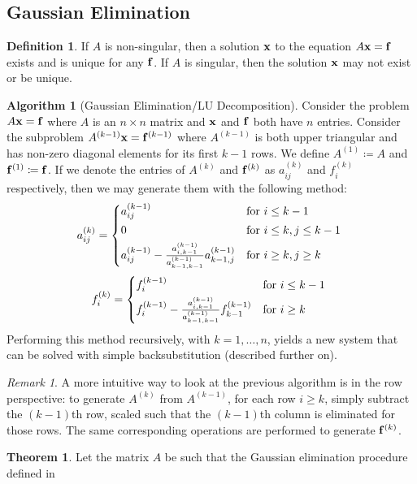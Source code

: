 \documentclass[11pt,letterpaper]{article}
\numberwithin{figure}{section} %
\newcommand{\keyword}[1]{\colorbox{cyan!20!}{#1}}
\theoremstyle{definition}
\newtheorem{theorem}{Theorem}[subsection]
\theoremstyle{definition}
\theoremstyle{definition}
\theoremstyle{definition}
\newtheorem{definition}{Definition}[subsection]
\theoremstyle{definition}
\theoremstyle{remark}
\newtheorem*{remark}{Remark}
\theoremstyle{remark}
\theoremstyle{definition}
\newtheorem*{algorithm}{Algorithm}
\theoremstyle{remark}
\theoremstyle{remark}
\begin{document}
\begin{multicols*}{3}
\subsection{Gaussian Elimination}
\begin{definition}
	If $A$ is \keyword{non-singular}, then a solution $\vb{x}$ to the equation
	$A\vb{x} = \vb{f}$ exists and is unique for any $\vb{f}$. If $A$ is
	\keyword{singular}, then the solution $\vb{x}$ may not exist or be unique.
\end{definition}
\begin{algorithm}[Gaussian Elimination/LU Decomposition]\label{alg:GE}
	Consider the problem $A\vb{x} = \vb{f}$ where $A$ is an $n \times n$ matrix
	and $\vb{x}$ and $\vb{f}$ both have $n$ entries. Consider the subproblem
	$A^{(k-1)}\vb{x} = \vb{f}^{(k-1)}$ where $A^{(k-1)}$ is both upper triangular and has
	non-zero diagonal elements for its first $k-1$ rows. We define $A^{(1)} \coloneqq
	A$ and $\vb{f}^{(1)} \coloneqq \vb{f}$. If we denote the entries of
	$A^{(k)}$ and $\vb{f}^{(k)}$ as $a_{ij}^{(k)}$ and $f_i^{(k)}$ respectively,
	then we may generate them with the following method:
	\[
		a_{ij}^{(k)} = 
		\begin{cases*}
			a_{ij}^{(k-1)} & for $i \leq k - 1$ \\
			0 & for $i \leq k, j \leq k -1$ \\
			a_{ij}^{(k-1)} - \frac{a_{i, k-1}^{(k-1)}}{a_{k-1, k-1}^{(k-1)}} a_{k-1,j}^{(k-1)} & for $i \geq k, j \geq k$
		\end{cases*}
	\]
	\[
		f_i^{(k)} = 
		\begin{cases*}
			f_i^{(k-1)} & for $i \leq k-1$ \\
			f_i^{(k-1)} - \frac{a_{i, k-1}^{(k-1)}}{a_{k-1, k-1}^{(k-1)}} f_{k-1}^{(k-1)} & for $i \geq k$
		\end{cases*}
	\]
	Performing this method recursively, with $k=1,\ldots, n$, yields a new system
	that can be solved with simple backsubstitution (described further on). 
\end{algorithm}
\begin{remark}
	A more intuitive way to look at the previous algorithm is in the row
	perspective: to generate $A^{(k)}$ from $A^{(k-1)}$, for each row $i \geq k$,
	simply subtract the $(k-1)$th row, scaled such that the $(k-1)$th column is
	eliminated for those rows. The same corresponding operations are performed
	to generate $\vb{f}^{(k)}$.
\end{remark}
\begin{theorem}
	Let the matrix $A$ be such that the Gaussian elimination procedure defined in

\end{theorem}
\end{multicols*}
\end{document}
